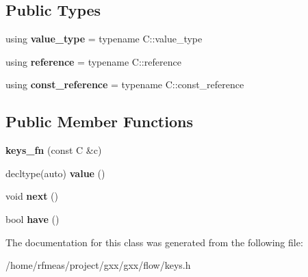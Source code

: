 \subsection*{Public Types}
\begin{DoxyCompactItemize}
\item 
using {\bfseries value\+\_\+type} = typename C\+::value\+\_\+type\hypertarget{classgxx_1_1flow_1_1keys__fn_ab777168548f297736ca8bb30a38182e7}{}\label{classgxx_1_1flow_1_1keys__fn_ab777168548f297736ca8bb30a38182e7}

\item 
using {\bfseries reference} = typename C\+::reference\hypertarget{classgxx_1_1flow_1_1keys__fn_a2598a40907e37650f6ff8be2b0a896ae}{}\label{classgxx_1_1flow_1_1keys__fn_a2598a40907e37650f6ff8be2b0a896ae}

\item 
using {\bfseries const\+\_\+reference} = typename C\+::const\+\_\+reference\hypertarget{classgxx_1_1flow_1_1keys__fn_af218a237118c4c7186904ebbd5f65514}{}\label{classgxx_1_1flow_1_1keys__fn_af218a237118c4c7186904ebbd5f65514}

\end{DoxyCompactItemize}
\subsection*{Public Member Functions}
\begin{DoxyCompactItemize}
\item 
{\bfseries keys\+\_\+fn} (const C \&c)\hypertarget{classgxx_1_1flow_1_1keys__fn_aa9b8d2fbcb55fb0a73dea006f9a27b19}{}\label{classgxx_1_1flow_1_1keys__fn_aa9b8d2fbcb55fb0a73dea006f9a27b19}

\item 
decltype(auto) {\bfseries value} ()\hypertarget{classgxx_1_1flow_1_1keys__fn_a06d62869f7eb8a9fa34a60d2e8e8e0fe}{}\label{classgxx_1_1flow_1_1keys__fn_a06d62869f7eb8a9fa34a60d2e8e8e0fe}

\item 
void {\bfseries next} ()\hypertarget{classgxx_1_1flow_1_1keys__fn_ab603fe684baffcc9db4365cf0b9a9e80}{}\label{classgxx_1_1flow_1_1keys__fn_ab603fe684baffcc9db4365cf0b9a9e80}

\item 
bool {\bfseries have} ()\hypertarget{classgxx_1_1flow_1_1keys__fn_abaeeef17ca42e013101a163fd9d5b0d7}{}\label{classgxx_1_1flow_1_1keys__fn_abaeeef17ca42e013101a163fd9d5b0d7}

\end{DoxyCompactItemize}


The documentation for this class was generated from the following file\+:\begin{DoxyCompactItemize}
\item 
/home/rfmeas/project/gxx/gxx/flow/keys.\+h\end{DoxyCompactItemize}
